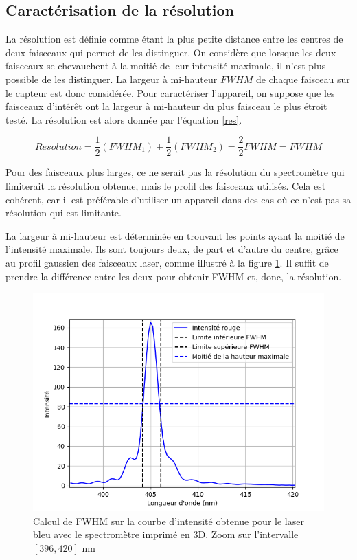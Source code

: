 \documentclass[11pt,letterpaper]{article}
\begin{document}

\subsection{Caractérisation de la résolution}

La résolution est définie comme étant la plus petite distance entre les centres de deux
faisceaux qui permet de les distinguer. On considère que lorsque les deux faisceaux se 
chevauchent à la moitié de leur intensité maximale, il n'est plus possible de les distinguer.
La largeur à mi-hauteur $FWHM$ de chaque faisceau sur le capteur est donc considérée. Pour 
caractériser l'appareil, on suppose que les faisceaux d'intérêt ont la largeur à mi-hauteur
du plus faisceau le plus étroit testé. La résolution est alors donnée par l'équation \ref{res}.

\begin{equation}\label{res}
  Resolution = \frac{1}{2}(FWHM_1)+\frac{1}{2}(FWHM_2)=\frac{2}{2}FWHM=FWHM
\end{equation}

Pour des faisceaux plus larges, ce ne serait pas la 
résolution du spectromètre qui limiterait la résolution obtenue, mais le profil des faisceaux
utilisés. Cela est cohérent, car il est préférable d'utiliser un appareil dans des cas où 
ce n'est pas sa résolution qui est limitante. 

La largeur à mi-hauteur est déterminée en trouvant les points ayant la moitié de l'intensité 
maximale. Ils sont toujours deux, de part et d'autre du centre, grâce au profil gaussien
des faisceaux laser, comme illustré à la figure \ref{FWHM_bleu}. Il suffit de prendre la 
différence entre les deux pour obtenir FWHM et, donc, la résolution. 

\begin{figure}[h!]
  \centering
  \includegraphics[width=0.8\linewidth]{FWHM_bleu_3D.png}
  \caption{Calcul de FWHM sur la courbe d'intensité obtenue pour le laser bleu avec le spectromètre imprimé en 3D. Zoom sur l'intervalle $[396, 420]$ nm}
  \label{FWHM_bleu}
\end{figure}
\end{document}
